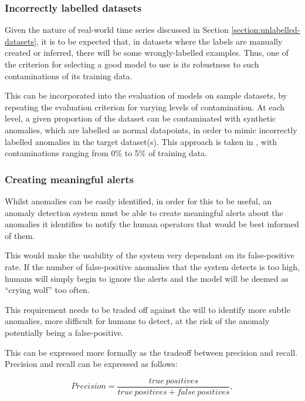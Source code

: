 \documentclass{mpaper}
\begin{document}
\subsubsection{Incorrectly labelled datasets}
\label{section:incorrect-labels-contaminations}

Given the nature of real-world time series discussed in Section \ref{section:unlabelled-datasets}, it is to be expected that, in datasets where the labels are manually created or inferred, there will be some wrongly-labelled examples. Thus, one of the criterion for selecting a good model to use is its robustness to such contaminations of its training data.

This can be incorporated into the evaluation of models on sample datasets, by repeating the evaluation criterion for varying levels of contamination. At each level, a given proportion of the dataset can be contaminated with synthetic anomalies, which are labelled as normal datapoints, in order to mimic incorrectly labelled anomalies in the target dataset(s). This approach is taken in \cite{DAGMM}, with contaminations ranging from 0\% to 5\% of training data.

\subsubsection{Creating meaningful alerts}
\label{section:meaningful-alerts}

Whilst anomalies can be easily identified, in order for this to be useful, an anomaly detection system must be able to create meaningful alerts about the anomalies it identifies to notify the human operators that would be best informed of them.

This would make the usability of the system very dependant on its false-positive rate. If the number of false-positive anomalies that the system detects is too high, humans will simply begin to ignore the alerts and the model will be deemed as ``crying wolf'' too often.

This requirement needs to be traded off against the will to identify more subtle anomalies, more difficult for humans to detect, at the risk of the anomaly potentially being a false-positive.

This can be expressed more formally as the tradeoff between precision and recall. Precision and recall can be expressed as follows:

$$
Precision = \frac{true \: positives}{true \: positives + false \: positives},
$$
\end{document}
